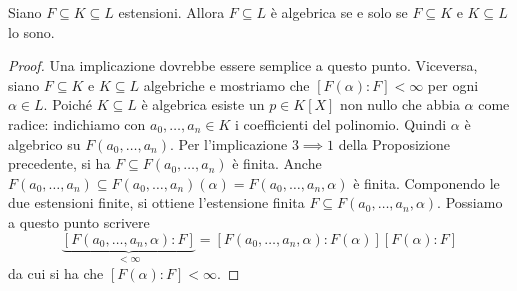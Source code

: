 \begin{prop}
Siano \(F\subseteq K\subseteq L\) estensioni. Allora \(F\subseteq L\) è algebrica se e solo se \(F \subseteq K\) e \(K \subseteq L\) lo sono.
\end{prop}

\begin{proof}
Una implicazione dovrebbe essere semplice a questo punto. Viceversa, siano \(F \subseteq K\) e \(K \subseteq L\) algebriche e mostriamo che \([F(\alpha):F] < \infty\) per ogni \(\alpha \in L\). Poiché \(K \subseteq L\) è algebrica esiste un \(p \in K[X]\) non nullo che abbia \(\alpha\) come radice: indichiamo con \(a_0, \dots{}, a_n \in K\) i coefficienti del polinomio. Quindi \(\alpha\) è algebrico su \(F\left(a_0, \dots{}, a_n\right)\). Per l'implicazione \(3 \implies 1\) della Proposizione precedente, si ha \(F \subseteq F\left(a_0, \dots{}, a_n\right)\) è finita. Anche \(F\left(a_0, \dots{}, a_n\right) \subseteq F\left(a_0, \dots{}, a_n\right)(\alpha) = F\left(a_0, \dots{}, a_n, \alpha\right)\) è finita. Componendo le due estensioni finite, si ottiene l'estensione finita \(F \subseteq F\left(a_0, \dots{}, a_n, \alpha\right)\). Possiamo a questo punto scrivere
\[\underbrace{[F\left(a_0, \dots{}, a_n, \alpha\right) : F]}_{< \infty} = [F\left(a_0, \dots{}, a_n, \alpha\right) : F(\alpha)] [F(\alpha) : F]\]
da cui si ha che \([F(\alpha):F] < \infty\).
\end{proof}
